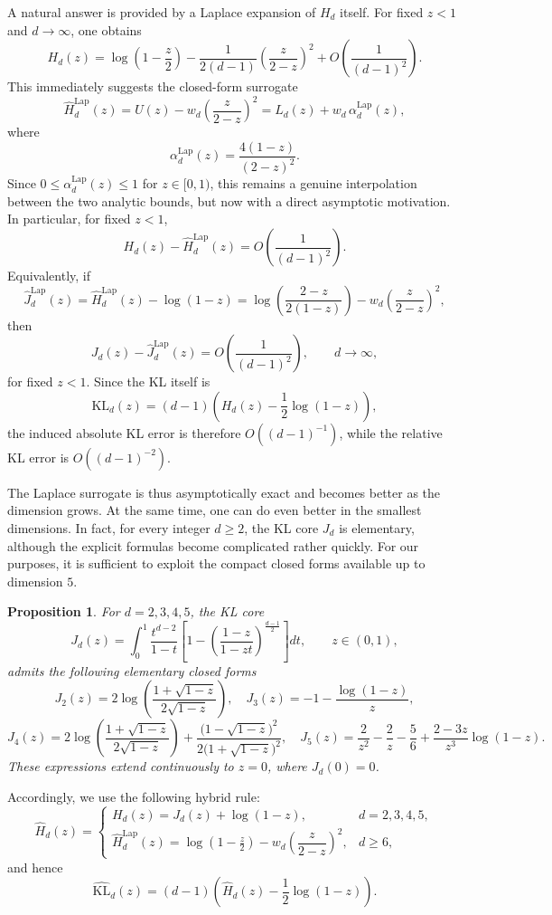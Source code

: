 \documentclass{article}
\newtheorem{prop}{Proposition}
\begin{document}
A natural answer is provided by a Laplace expansion of \(H_d\) itself.
For fixed \(z<1\) and \(d\to\infty\), one obtains
\[
H_d(z)
=
\log\left(1-\frac{z}{2}\right)
-\frac{1}{2(d-1)}\left(\frac{z}{2-z}\right)^2
+O\!\left(\frac{1}{(d-1)^2}\right).
\]
This immediately suggests the closed-form surrogate
\[
\widehat H_d^{\mathrm{Lap}}(z)
=
U(z)-w_d\left(\frac{z}{2-z}\right)^2
=
L_d(z)+w_d\,\alpha_d^{\mathrm{Lap}}(z),
\]
where
\[
\alpha_d^{\mathrm{Lap}}(z)=\frac{4(1-z)}{(2-z)^2}.
\]
Since \(0\le \alpha_d^{\mathrm{Lap}}(z)\le 1\) for \(z\in[0,1)\), this remains a genuine interpolation between the two analytic bounds, but now with a direct asymptotic motivation. In particular, for fixed \(z<1\),
\[
H_d(z)-\widehat H_d^{\mathrm{Lap}}(z)=O\!\left(\frac{1}{(d-1)^2}\right).
\]
Equivalently, if
\[
\widehat J_d^{\mathrm{Lap}}(z)
=
\widehat H_d^{\mathrm{Lap}}(z)-\log(1-z)
=
\log\left(\frac{2-z}{2(1-z)}\right)-w_d\left(\frac{z}{2-z}\right)^2,
\]
then
\[
J_d(z)-\widehat J_d^{\mathrm{Lap}}(z)=O\!\left(\frac{1}{(d-1)^2}\right),
\qquad d\to\infty,
\]
for fixed \(z<1\). Since the KL itself is
\[
\mathrm{KL}_d(z)=(d-1)\left(H_d(z)-\frac12\log(1-z)\right),
\]
the induced absolute KL error is therefore \(O((d-1)^{-1})\), while the relative KL error is \(O((d-1)^{-2})\).

The Laplace surrogate is thus asymptotically exact and becomes better as the dimension grows.
At the same time, one can do even better in the smallest dimensions. In fact, for every integer \(d\ge 2\),
the KL core \(J_d\) is elementary, although the explicit formulas become complicated rather quickly.
For our purposes, it is sufficient to exploit the compact closed forms available up to dimension \(5\).

\begin{prop}\label{p:Jd-low-d-closed}
For \(d=2,3,4,5\), the KL core
\[
J_d(z)=\int_0^1 \frac{t^{d-2}}{1-t}\left[1-\left(\frac{1-z}{1-zt}\right)^{\frac{d-1}{2}}\right]dt,
\qquad z\in(0,1),
\]
admits the following elementary closed forms
\[
J_2(z)=2\log\left(\frac{1+\sqrt{1-z}}{2\sqrt{1-z}}\right),
\quad 
J_3(z)=-1-\frac{\log(1-z)}{z},
\]
\[
J_4(z)=2\log\left(\frac{1+\sqrt{1-z}}{2\sqrt{1-z}}\right)
+\frac{\bigl(1-\sqrt{1-z}\bigr)^2}{2\bigl(1+\sqrt{1-z}\bigr)^2},
\quad
J_5(z)=\frac{2}{z^2}-\frac{2}{z}-\frac{5}{6}
+\frac{2-3z}{z^3}\log(1-z).
\]
These expressions extend continuously to \(z=0\), where \(J_d(0)=0\).
\end{prop}

Accordingly, we use the following hybrid rule:
\[
\widehat H_d(z)=
\begin{cases}
H_d(z) = J_d(z)+\log(1-z), & d=2,3,4,5,\\[1mm]
\widehat H_d^{\mathrm{Lap}}(z) = \log\left(1-\frac{z}{2}\right)-w_d\left(\dfrac{z}{2-z}\right)^2, & d\ge 6,
\end{cases}
\]
and hence
\[
\widehat{\mathrm{KL}}_d(z)
=
(d-1)\left(\widehat H_d(z)-\frac12\log(1-z)\right).
\]
\end{document}
